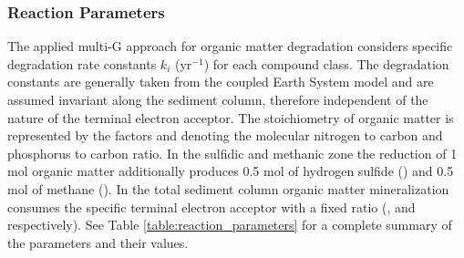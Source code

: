 \documentclass[gmd, manuscript]{copernicus}
\begin{document}
\subsubsection {Reaction Parameters}
The applied multi-G approach for organic matter degradation considers specific degradation rate constants $k_i$ (yr$^{-1}$) for each compound class. The degradation constants are generally taken from the coupled Earth System model 
and are assumed invariant along the sediment column, therefore independent of the nature of the terminal electron acceptor. 
The stoichiometry of organic matter is represented by the factors  and  denoting the molecular nitrogen to carbon and phosphorus to carbon ratio. 
In the sulfidic and methanic zone the 
reduction of 1 mol organic matter additionally produces 0.5 mol of hydrogen sulfide () and 0.5 mol of methane (). 
In the total sediment column organic matter mineralization consumes the specific terminal electron acceptor with a fixed ratio (,  and  respectively). 
See Table \ref{table:reaction_parameters} for a complete summary of the parameters and their values.
\end{document}
